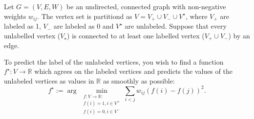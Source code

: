 \begin{myexercise}\label{prob:hitting_times_semi_supervised}
    Let $G = (V,E,W)$ be an undirected, connected graph with non-negative weights $w_{ij}$. The vertex set is partitiond as $V = V_{+} \cup V_{\scriptstyle -} \cup V^{\star}$, where $V_{+}$ are labeled as 1, $V_{\scriptstyle -}$ are labeled as 0 and $V^{\star}$ are unlabeled. Suppose that every unlabelled vertex ($V_{\star}$) is connected to at least one labelled vertex ($V_{+} \cup V_{\scriptstyle -}$) by an edge.
    
    To predict the label of the unlabeled vertices, you wish to find a function $f^{\star}: V \to \mathbb{R}$ which agrees on the labeled vertices and predicts the values of the unlabeled vertices as values in $\mathbb{R}$ as smoothly as possible:
    \begin{equation}\label{eq:optproblem}
        f^\star := \arg\,\min_{\substack{f: V \to \mathbb{R}: \\ f(i) = 1, i \in V^+ \\ f(i) = 0, i \in V^-}} \sum_{i < j} w_{ij} (f(i) - f(j))^2.
    \end{equation}
    

\end{myexercise}
